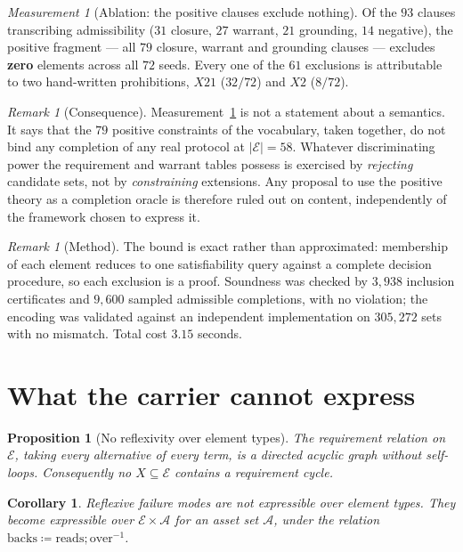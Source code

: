 \documentclass[11pt,reqno]{amsart}
\theoremstyle{plain}
\newtheorem{proposition}[theorem]{Proposition}
\newtheorem{corollary}[theorem]{Corollary}
\theoremstyle{definition}
\theoremstyle{remark}
\newtheorem{measurement}[theorem]{Measurement}
\newtheorem{remark}[theorem]{Remark}
\newcommand{\El}{\mathcal{E}}
\begin{document}
\begin{measurement}[Ablation: the positive clauses exclude nothing]\label{meas:ablation58}
Of the $93$ clauses transcribing admissibility ($31$ closure, $27$ warrant, $21$
grounding, $14$ negative), the positive fragment --- all $79$ closure, warrant
and grounding clauses --- excludes \textbf{zero} elements across all $72$ seeds.
Every one of the $61$ exclusions is attributable to two hand-written
prohibitions, $X21$ ($32/72$) and $X2$ ($8/72$).
\end{measurement}

\begin{remark}[Consequence]
Measurement~\ref{meas:ablation58} is not a statement about a semantics. It says
that the $79$ positive constraints of the vocabulary, taken together, do not
bind any completion of any real protocol at $|\El| = 58$. Whatever discriminating
power the requirement and warrant tables possess is exercised by
\emph{rejecting} candidate sets, not by \emph{constraining} extensions. Any
proposal to use the positive theory as a completion oracle is therefore ruled out
on content, independently of the framework chosen to express it.
\end{remark}

\begin{remark}[Method]
The bound is exact rather than approximated: membership of each element reduces
to one satisfiability query against a complete decision procedure, so each
exclusion is a proof. Soundness was checked by $3{,}938$ inclusion certificates
and $9{,}600$ sampled admissible completions, with no violation; the encoding was
validated against an independent implementation on $305{,}272$ sets with no
mismatch. Total cost $3.15$ seconds.
\end{remark}

\section{What the carrier cannot express}

\begin{proposition}[No reflexivity over element types]\label{prop:dag}
The requirement relation on $\El$, taking every alternative of every term, is a
directed acyclic graph without self-loops. Consequently no $X \subseteq \El$
contains a requirement cycle.
\end{proposition}

\begin{corollary}
Reflexive failure modes are not expressible over element types. They become
expressible over $\El \times \mathcal{A}$ for an asset set $\mathcal{A}$, under
the relation $\mathrm{backs} \coloneqq \mathrm{reads} \mathbin{;} \mathrm{over}^{-1}$.
\end{corollary}
\end{document}
